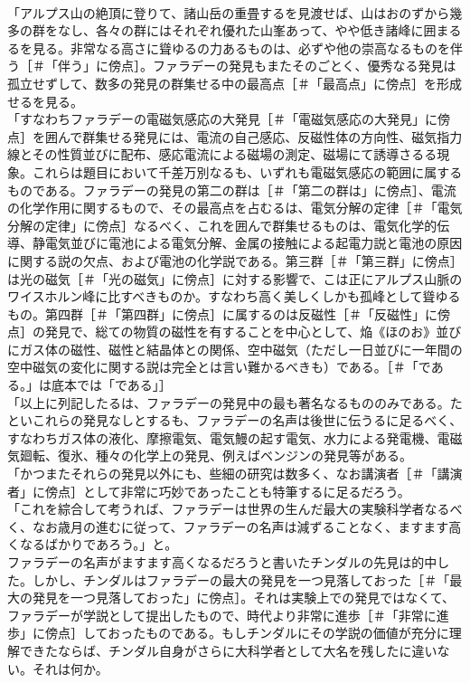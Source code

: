 \documentclass[8pt]{extreport}
\begin{document}
\begin{CJK}{UTF8}{min}
\\	「アルプス山の絶頂に登りて、諸山岳の重畳するを見渡せば、山はおのずから幾多の群をなし、各々の群にはそれぞれ優れた山峯あって、やや低き諸峰に囲まるるを見る。非常なる高さに聳ゆるの力あるものは、必ずや他の崇高なるものを伴う［＃「伴う」に傍点］。ファラデーの発見もまたそのごとく、優秀なる発見は孤立せずして、数多の発見の群集せる中の最高点［＃「最高点」に傍点］を形成せるを見る。
\\	「すなわちファラデーの電磁気感応の大発見［＃「電磁気感応の大発見」に傍点］を囲んで群集せる発見には、電流の自己感応、反磁性体の方向性、磁気指力線とその性質並びに配布、感応電流による磁場の測定、磁場にて誘導さるる現象。これらは題目において千差万別なるも、いずれも電磁気感応の範囲に属するものである。ファラデーの発見の第二の群は［＃「第二の群は」に傍点］、電流の化学作用に関するもので、その最高点を占むるは、電気分解の定律［＃「電気分解の定律」に傍点］なるべく、これを囲んで群集せるものは、電気化学的伝導、静電気並びに電池による電気分解、金属の接触による起電力説と電池の原因に関する説の欠点、および電池の化学説である。第三群［＃「第三群」に傍点］は光の磁気［＃「光の磁気」に傍点］に対する影響で、こは正にアルプス山脈のワイスホルン峰に比すべきものか。すなわち高く美しくしかも孤峰として聳ゆるもの。第四群［＃「第四群」に傍点］に属するのは反磁性［＃「反磁性」に傍点］の発見で、総ての物質の磁性を有することを中心として、焔《ほのお》並びにガス体の磁性、磁性と結晶体との関係、空中磁気（ただし一日並びに一年間の空中磁気の変化に関する説は完全とは言い難かるべきも）である。［＃「である。」は底本では「である」］
\\	「以上に列記したるは、ファラデーの発見中の最も著名なるもののみである。たといこれらの発見なしとするも、ファラデーの名声は後世に伝うるに足るべく、すなわちガス体の液化、摩擦電気、電気鰻の起す電気、水力による発電機、電磁気廻転、復氷、種々の化学上の発見、例えばベンジンの発見等がある。
\\	「かつまたそれらの発見以外にも、些細の研究は数多く、なお講演者［＃「講演者」に傍点］として非常に巧妙であったことも特筆するに足るだろう。
\\	「これを綜合して考うれば、ファラデーは世界の生んだ最大の実験科学者なるべく、なお歳月の進むに従って、ファラデーの名声は減ずることなく、ますます高くなるばかりであろう。」と。
\\	ファラデーの名声がますます高くなるだろうと書いたチンダルの先見は的中した。しかし、チンダルはファラデーの最大の発見を一つ見落しておった［＃「最大の発見を一つ見落しておった」に傍点］。それは実験上での発見ではなくて、ファラデーが学説として提出したもので、時代より非常に進歩［＃「非常に進歩」に傍点］しておったものである。もしチンダルにその学説の価値が充分に理解できたならば、チンダル自身がさらに大科学者として大名を残したに違いない。それは何か。

\end{CJK}
\end{document}
